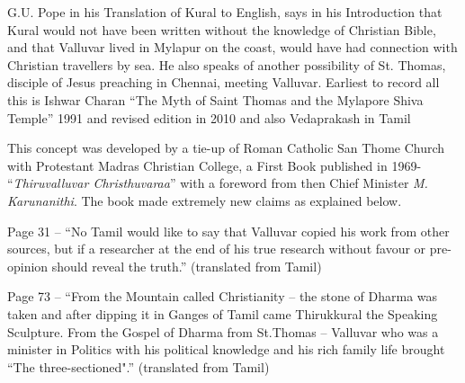 G.U. Pope in his Translation of Kural to English, says in his Introduction that Kural would not have been written without the knowledge of Christian Bible, and that Valluvar lived in Mylapur on the coast, would have had connection with Christian travellers by sea. He also speaks of another possibility of St. Thomas, disciple of Jesus preaching in Chennai, meeting Valluvar. Earliest to record all this is Ishwar Charan “The Myth of Saint Thomas and the Mylapore Shiva Temple” 1991 and revised edition in 2010 and also Vedaprakash in Tamil 

This concept was developed by a tie-up of Roman Catholic San Thome Church with Protestant Madras Christian College, a First Book published in 1969- “\textit{Thiruvalluvar Christhuvaraa}” with a foreword from then Chief Minister \textit{M. Karunanithi}. The book made extremely new claims as explained below.

Page 31 -- “No Tamil would like to say that Valluvar copied his work from other sources, but if a researcher at the end of his true research without favour or pre-opinion should reveal the truth.” (translated from Tamil) 

Page 73 -- “From the Mountain called Christianity – the stone of Dharma was taken and after dipping it in Ganges of Tamil came Thirukkural the Speaking Sculpture. From the Gospel of Dharma from St.Thomas – Valluvar who was a minister in Politics with his political knowledge and his rich family life brought “The three-sectioned".” (translated from Tamil)

